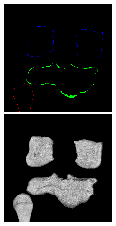 \begin{figure}[H]
\endminipage\hfill
{}%
  \includegraphics[width=\linewidth]{imgs/c2.png}
\endminipage\hfill
{}%
  \includegraphics[width=\linewidth]{imgs/d2.png}

\end{figure}
